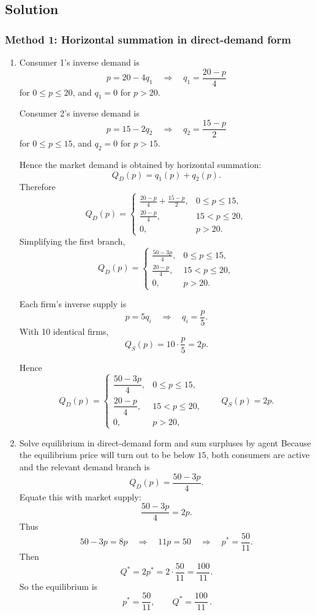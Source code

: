 \documentclass[12pt]{article}
\begin{document}
\newpage
\subsection{Solution}

\subsubsection{Method 1: Horizontal summation in direct-demand form}
\begin{enumerate}[label=(\alph*)]
    \item Consumer 1's inverse demand is
\[
p=20-4q_1
\quad\Longrightarrow\quad
q_1=\frac{20-p}{4}
\]
for \(0\le p\le 20\), and \(q_1=0\) for \(p>20\).

Consumer 2's inverse demand is
\[
p=15-2q_2
\quad\Longrightarrow\quad
q_2=\frac{15-p}{2}
\]
for \(0\le p\le 15\), and \(q_2=0\) for \(p>15\).

Hence the market demand is obtained by horizontal summation:
\[
Q_D(p)=q_1(p)+q_2(p).
\]
Therefore
\[
Q_D(p)=
\begin{cases}
\displaystyle \frac{20-p}{4}+\frac{15-p}{2}, & 0\le p\le 15,\\[0.9em]
\displaystyle \frac{20-p}{4}, & 15<p\le 20,\\[0.7em]
0, & p>20.
\end{cases}
\]
Simplifying the first branch,
\[
Q_D(p)=
\begin{cases}
\displaystyle \frac{50-3p}{4}, & 0\le p\le 15,\\[0.8em]
\displaystyle \frac{20-p}{4}, & 15<p\le 20,\\[0.7em]
0, & p>20.
\end{cases}
\]

Each firm's inverse supply is
\[
p=5q_i
\quad\Longrightarrow\quad
q_i=\frac{p}{5}.
\]
With 10 identical firms,
\[
Q_S(p)=10\cdot \frac{p}{5}=2p.
\]

Hence
\[
\boxed{\,
Q_D(p)=
\begin{cases}
\dfrac{50-3p}{4}, & 0\le p\le 15,\\[0.8em]
\dfrac{20-p}{4}, & 15<p\le 20,\\[0.7em]
0, & p>20,
\end{cases}
\qquad
Q_S(p)=2p.
\,}
\]


    \item Solve equilibrium in direct-demand form and sum surpluses by agent
Because the equilibrium price will turn out to be below \(15\), both consumers are active and the relevant demand branch is
\[
Q_D(p)=\frac{50-3p}{4}.
\]
Equate this with market supply:
\[
\frac{50-3p}{4}=2p.
\]
Thus
\[
50-3p=8p
\quad\Longrightarrow\quad
11p=50
\quad\Longrightarrow\quad
p^*=\frac{50}{11}.
\]
Then
\[
Q^*=2p^*=2\cdot \frac{50}{11}=\frac{100}{11}.
\]
So the equilibrium is
\[
\boxed{\,p^*=\frac{50}{11},\qquad Q^*=\frac{100}{11}\,.}
\]


\end{enumerate}
\end{document}
